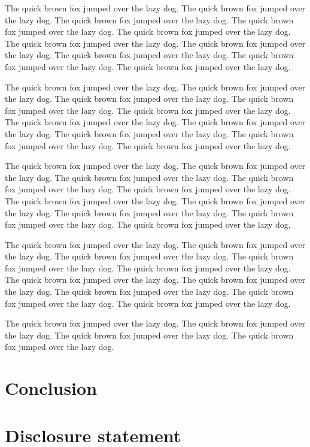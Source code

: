 \documentclass[
  12pt]{article}
\begin{document}
The quick brown fox jumped over the lazy dog. The quick brown fox jumped
over the lazy dog. The quick brown fox jumped over the lazy dog. The
quick brown fox jumped over the lazy dog. The quick brown fox jumped
over the lazy dog. The quick brown fox jumped over the lazy dog. The
quick brown fox jumped over the lazy dog. The quick brown fox jumped
over the lazy dog. The quick brown fox jumped over the lazy dog. The
quick brown fox jumped over the lazy dog.

The quick brown fox jumped over the lazy dog. The quick brown fox jumped
over the lazy dog. The quick brown fox jumped over the lazy dog. The
quick brown fox jumped over the lazy dog. The quick brown fox jumped
over the lazy dog. The quick brown fox jumped over the lazy dog. The
quick brown fox jumped over the lazy dog. The quick brown fox jumped
over the lazy dog. The quick brown fox jumped over the lazy dog. The
quick brown fox jumped over the lazy dog.

The quick brown fox jumped over the lazy dog. The quick brown fox jumped
over the lazy dog. The quick brown fox jumped over the lazy dog. The
quick brown fox jumped over the lazy dog. The quick brown fox jumped
over the lazy dog. The quick brown fox jumped over the lazy dog. The
quick brown fox jumped over the lazy dog. The quick brown fox jumped
over the lazy dog. The quick brown fox jumped over the lazy dog. The
quick brown fox jumped over the lazy dog.

The quick brown fox jumped over the lazy dog. The quick brown fox jumped
over the lazy dog. The quick brown fox jumped over the lazy dog. The
quick brown fox jumped over the lazy dog. The quick brown fox jumped
over the lazy dog. The quick brown fox jumped over the lazy dog. The
quick brown fox jumped over the lazy dog. The quick brown fox jumped
over the lazy dog. The quick brown fox jumped over the lazy dog. The
quick brown fox jumped over the lazy dog.

The quick brown fox jumped over the lazy dog. The quick brown fox jumped
over the lazy dog. The quick brown fox jumped over the lazy dog. The
quick brown fox jumped over the lazy dog.

\addtolength{\textheight}{-.2in}%

\section{Conclusion}\label{sec-conc}

\section{Disclosure statement}\label{disclosure-statement}
\end{document}
